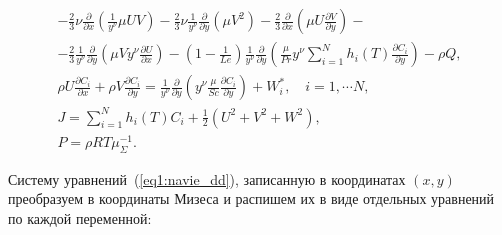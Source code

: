 \begin{equation}
\begin{gathered}
-\frac{2}{3} \nu \frac{\partial}{\partial x}\left(\frac{1}{y^\nu} \mu U V\right) - \frac{2}{3} \nu \frac{1}{y^\nu} \frac{\partial}{\partial y}\left(\mu V^{2}\right)-\frac{2}{3} \frac{\partial}{\partial x}\left(\mu U \frac{\partial V}{\partial y}\right)-\\
-\frac{2}{3} \frac{1}{y^\nu} \frac{\partial}{\partial y}\left(\mu V y^\nu \frac{\partial U}{\partial x}\right)-\left(1-\frac{1}{L e}\right) \frac{1}{y^\nu} \frac{\partial}{\partial y}\left(\frac{\mu}{P r} y^\nu \sum_{i=1}^{N} h_{i}(T) \frac{\partial C_{i}}{\partial y}\right)-\rho Q, \\
\rho U \frac{\partial C_{i}}{\partial x}+\rho V \frac{\partial C_{i}}{\partial y}=\frac{1}{y^\nu} \frac{\partial}{\partial y}\left(y^\nu \frac{\mu}{S c} \frac{\partial C_{i}}{\partial y}\right)+W_{i}^{*}, \quad i=1, \cdots N, \\
J = \sum_{i = 1}^{N}h_i(T)C_i + \frac{1}{2}(U^2 + V^2 + W^2), \\
P = \rho RT\mu_\Sigma^{-1}.
\end{gathered}
\end{equation}

Систему уравнений~(\ref{eq1:navie_dd}), записанную в координатах $(x, y)$ преобразуем в координаты Мизеса и распишем их в виде отдельных уравнений по каждой переменной:

